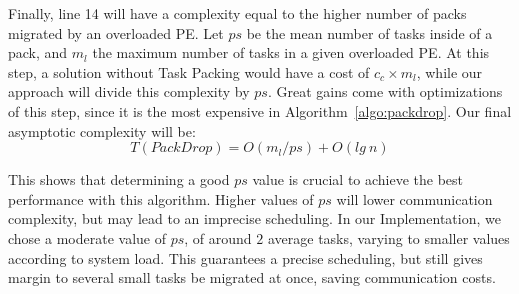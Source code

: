 Finally, line 14 will have a complexity equal to the higher number of packs migrated by an overloaded PE.
Let $ps$ be the mean number of tasks inside of a pack, and $m_l$ the maximum number of tasks in a given overloaded PE.
At this step, a solution without Task Packing would have a cost of $c_c\times m_l$, while our approach will divide this complexity by $ps$. 
Great gains come with optimizations of this step, since it is the most expensive in Algorithm~\ref{algo:packdrop}.
Our final asymptotic complexity will be:
\begin{equation}
 T(PackDrop) = O(m_l/ps) + O(lg\ n)
 \label{eq:worstcase}
\end{equation}

This shows that determining a good $ps$ value is crucial to achieve the best performance with this algorithm.
Higher values of $ps$ will lower communication complexity, but may lead to an imprecise scheduling.
In our Implementation, we chose a moderate value of $ps$, of around $2$ average tasks, varying to smaller values according to system load.
This guarantees a precise scheduling, but still gives margin to several small tasks be migrated at once, saving communication costs.